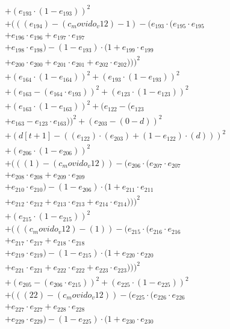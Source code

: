 \documentclass[10pt, a4paper]{article}
\begin{document}
\begin{small}
\begin{align*}
& + (e_{193} \cdot (1 - e_{193}))^{2} \\
& + (((e_{194}) - (c_movido_v12) - 1) - (e_{193} \cdot (e_{195} \cdot e_{195} \\
& + e_{196} \cdot e_{196} + e_{197} \cdot e_{197} \\
& + e_{198} \cdot e_{198}) - (1 - e_{193}) \cdot (1 + e_{199} \cdot e_{199} \\
& + e_{200} \cdot e_{200} + e_{201} \cdot e_{201} + e_{202} \cdot e_{202})))^{2} \\
& + (e_{164} \cdot (1 - e_{164}))^{2} + (e_{193} \cdot (1 - e_{193}))^{2} \\
& + (e_{163} - (e_{164} \cdot e_{193}))^{2} + (e_{123} \cdot (1 - e_{123}))^{2} \\
& + (e_{163} \cdot (1 - e_{163}))^{2} + (e_{122} - (e_{123} \\
& + e_{163} - e_{123} \cdot e_{163}))^{2} + (e_{203} - (0 - d))^{2} \\
& + (d[t+1] - ((e_{122})  \cdot  (e_{203}) + (1 - e_{122})  \cdot  (d)))^{2} \\
& + (e_{206} \cdot (1 - e_{206}))^{2} \\
& + (((1) - (c_movido_v12)) - (e_{206} \cdot (e_{207} \cdot e_{207} \\
& + e_{208} \cdot e_{208} + e_{209} \cdot e_{209} \\
& + e_{210} \cdot e_{210}) - (1 - e_{206}) \cdot (1 + e_{211} \cdot e_{211} \\
& + e_{212} \cdot e_{212} + e_{213} \cdot e_{213} + e_{214} \cdot e_{214})))^{2} \\
& + (e_{215} \cdot (1 - e_{215}))^{2} \\
& + (((c_movido_v12) - (1)) - (e_{215} \cdot (e_{216} \cdot e_{216} \\
& + e_{217} \cdot e_{217} + e_{218} \cdot e_{218} \\
& + e_{219} \cdot e_{219}) - (1 - e_{215}) \cdot (1 + e_{220} \cdot e_{220} \\
& + e_{221} \cdot e_{221} + e_{222} \cdot e_{222} + e_{223} \cdot e_{223})))^{2} \\
& + (e_{205} - (e_{206} \cdot e_{215}))^{2} + (e_{225} \cdot (1 - e_{225}))^{2} \\
& + (((22) - (c_movido_v12)) - (e_{225} \cdot (e_{226} \cdot e_{226} \\
& + e_{227} \cdot e_{227} + e_{228} \cdot e_{228} \\
& + e_{229} \cdot e_{229}) - (1 - e_{225}) \cdot (1 + e_{230} \cdot e_{230} \\

\end{align*}
\end{small}
\end{document}

